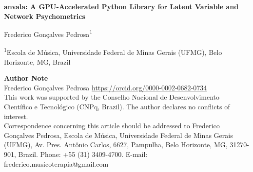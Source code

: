 ﻿\documentclass[12pt,letterpaper]{article}
\begin{document}
\begin{titlepage}
\centering
\vspace*{1.5cm}

{\Large \textbf{anvala: A GPU-Accelerated Python Library for Latent Variable and Network Psychometrics}\par}

\vspace{1.2cm}

{\large Frederico Gonçalves Pedrosa\textsuperscript{1}\par}

\vspace{0.6cm}

{\normalsize
\textsuperscript{1}Escola de Música, Universidade Federal de Minas Gerais (UFMG), Belo Horizonte, MG, Brazil\par
}

\vspace{1.5cm}

\begin{flushleft}
\textbf{Author Note}\\[4pt]
Frederico Gonçalves Pedrosa \url{https://orcid.org/0000-0002-0682-0734}\\
This work was supported by the Conselho Nacional de Desenvolvimento Científico e Tecnológico (CNPq, Brazil). The author declares no conflicts of interest.\\[8pt]
Correspondence concerning this article should be addressed to Frederico Gonçalves Pedrosa, Escola de Música, Universidade Federal de Minas Gerais (UFMG), Av. Pres. Antônio Carlos, 6627, Pampulha, Belo Horizonte, MG, 31270-901, Brazil. Phone: +55 (31) 3409-4700. E-mail: frederico.musicoterapia@gmail.com
\end{flushleft}
\end{titlepage}

\end{document}
